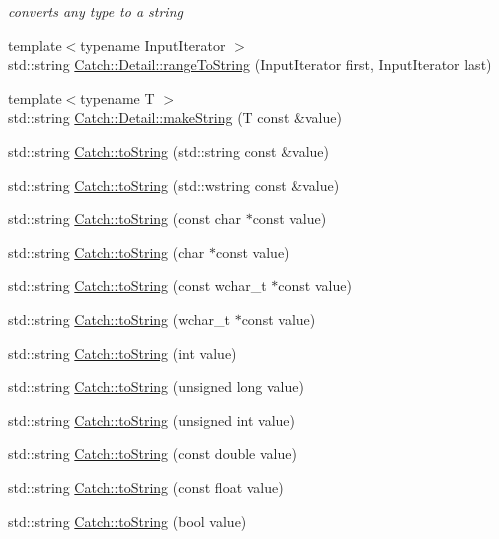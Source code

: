 \begin{DoxyCompactItemize}
\begin{DoxyCompactList}\small\item\em converts any type to a string \end{DoxyCompactList}\item 
{\footnotesize template$<$typename Input\+Iterator $>$ }\\std\+::string \hyperlink{a00118_a6650a1dff325bf29962ff15ae73fd972}{Catch\+::\+Detail\+::range\+To\+String} (Input\+Iterator first, Input\+Iterator last)
\item 
{\footnotesize template$<$typename T $>$ }\\std\+::string \hyperlink{a00118_aef46b4178e08758524d25d1d969a503c}{Catch\+::\+Detail\+::make\+String} (T const \&value)
\item 
std\+::string \hyperlink{a00117_ad6e969257437cf007b8b5017b22e570c}{Catch\+::to\+String} (std\+::string const \&value)
\item 
std\+::string \hyperlink{a00117_af9fc40701e3a7d0790866e7cf8c0279f}{Catch\+::to\+String} (std\+::wstring const \&value)
\item 
std\+::string \hyperlink{a00117_ace2e2fe33b196bc8278f605dcb72e38d}{Catch\+::to\+String} (const char $\ast$const value)
\item 
std\+::string \hyperlink{a00117_ae6c2bc95517444d8df8199bd3f61609b}{Catch\+::to\+String} (char $\ast$const value)
\item 
std\+::string \hyperlink{a00117_afa173b4639c682c9d8c20fae0939693c}{Catch\+::to\+String} (const wchar\+\_\+t $\ast$const value)
\item 
std\+::string \hyperlink{a00117_aa39121565abe9f30fce5d48e4e094768}{Catch\+::to\+String} (wchar\+\_\+t $\ast$const value)
\item 
std\+::string \hyperlink{a00117_acee54d0580385e4347bc42a7d22bc893}{Catch\+::to\+String} (int value)
\item 
std\+::string \hyperlink{a00117_aba1d78bce62f8c73cbfc2a14225356ea}{Catch\+::to\+String} (unsigned long value)
\item 
std\+::string \hyperlink{a00117_a6fd78030f740c1c3bdc60efdfd5fc85d}{Catch\+::to\+String} (unsigned int value)
\item 
std\+::string \hyperlink{a00117_a3eb4356d09b7ef3286f6c1c1efe8cabf}{Catch\+::to\+String} (const double value)
\item 
std\+::string \hyperlink{a00117_a80b6411e2cba89e58aa8feb960d045d5}{Catch\+::to\+String} (const float value)
\item 
std\+::string \hyperlink{a00117_a5d3bdb2ec0e6f415e2a1a0e4914d7d3a}{Catch\+::to\+String} (bool value)

\end{DoxyCompactItemize}
